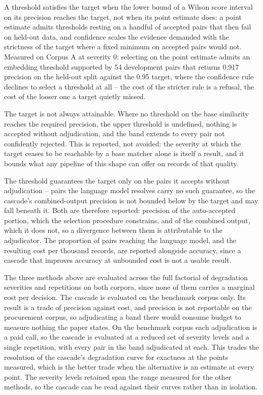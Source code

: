 \documentclass[conference]{IEEEtran}
\begin{document}
A threshold satisfies the target when the lower bound of a Wilson score
interval on its precision reaches the target, not when its point
estimate does: a point estimate admits thresholds resting on a handful
of accepted pairs that then fail on held-out data, and confidence
scales the evidence demanded with the strictness of the target where a
fixed minimum on accepted pairs would not. Measured on Corpus A at
severity 0: selecting on the point estimate admits an embedding
threshold supported by 54 development pairs that returns 0.917
precision on the held-out split against the 0.95 target, where the
confidence rule declines to select a threshold at all -- the cost of
the stricter rule is a refusal, the cost of the looser one a target
quietly missed.

The target is not always attainable. Where no threshold on the base
similarity reaches the required precision, the upper threshold is
undefined, nothing is accepted without adjudication, and the band extends
to every pair not confidently rejected. This is reported, not avoided: the severity at which the target ceases to
be reachable by a base matcher alone is itself a result, and it bounds
what any pipeline of this shape can offer on records of that quality.

The threshold guarantees the target only on the pairs it accepts
without adjudication -- pairs the language model resolves carry no
such guarantee, so the cascade's combined-output precision is not
bounded below by the target and may fall beneath it. Both are
therefore reported: precision of the auto-accepted portion, which the
selection procedure constrains, and of the combined output, which it
does not, so a divergence between them is attributable to the
adjudicator. The proportion of pairs reaching the language model, and
the resulting cost per thousand records, are reported alongside
accuracy, since a cascade that improves accuracy at unbounded cost is
not a usable result.

The three methods above are evaluated across the full factorial of
degradation severities and repetitions on both corpora, since none of
them carries a marginal cost per decision. The cascade is evaluated on
the benchmark corpus only. Its result is a trade of precision against
cost, and precision is not reportable on the procurement corpus, so
adjudicating a band there would consume budget to measure nothing the
paper states. On the benchmark corpus each adjudication is a paid call,
so the cascade is evaluated at a reduced set of severity levels and a
single repetition, with every pair in the band adjudicated at each. This
trades the resolution of the cascade's degradation curve for exactness at
the points measured, which is the better trade when the alternative is an
estimate at every point. The severity levels retained span the range
measured for the other methods, so the cascade can be read against their
curves rather than in isolation.
\end{document}
